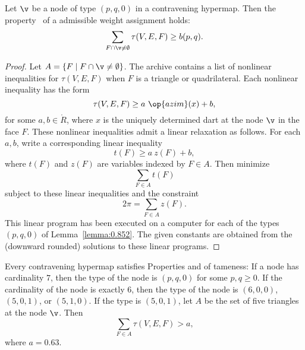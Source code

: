 \begin{lemma} \label{lemma:weightB}
  Let $\v$ be a node of type $(p,q,0)$ in a contravening hypermap.
  Then the property~ of a admissible weight assignment
  holds:
\begin{displaymath}
\sum_{ F\cap \v\ne \emptyset} \tau(V,E,F) \ge  b(p,q).
\end{displaymath}
\end{lemma}
%
%

\begin{proof} Let $A =\{F\mid F\cap \v\ne\emptyset\}$.  The archive
  \cite[FUSDSPJ]{hales:2009:nonlinear} contains a list of nonlinear
  inequalities for $\tau(V,E,F)$ when $F$ is a triangle or
  quadrilateral. Each nonlinear inequality has the form
\begin{displaymath}\tau(V,E,F) \ge a~\op{azim}(x) + b,\end{displaymath}
for some $a,b\in\ring{R}$, where $x$ is the uniquely determined dart
at the node $\v$ in the face $F$.  These nonlinear inequalities admit
a linear relaxation as follows.  For each $a,b$, write a corresponding
linear inequality %
%
\begin{displaymath}
t(F) \ge a~z(F) + b,
\end{displaymath}
where $t(F)$ and $z(F)$ are variables indexed by $F\in A$.
%
%
%
Then  minimize 
\begin{displaymath}\sum_{F\in A} t(F)\end{displaymath}
subject to these linear inequalities and the constraint
\begin{displaymath}
2\pi = \sum_{F\in A} z(F).
\end{displaymath}
This linear program has been executed on a computer for each of the
types $(p,q,0)$ of Lemma~\ref{lemma:0.852}. The given constants are
obtained from the (downward rounded) solutions to these linear
programs.
\end{proof}

\begin{lemma}\label{lemma:degE}
  Every contravening hypermap satisfies Properties 
  and 
of tameness: 
If a node has cardinality $7$, then the type of the
node is $(p,q,0)$ for some $p,q\ge0$.   If the
cardinality of the node is exactly $6$, then the type of the node
is $(6,0,0)$, $(5,0,1)$, or $(5,1,0)$.
If the type is $(5,0,1)$, let $A$ be the set of five triangles at the
node $\v$.  Then
%
\begin{displaymath}
\sum_{F\in A} \tau(V,E,F) > a,
\end{displaymath}
where $a=0.63$.
\end{lemma}



